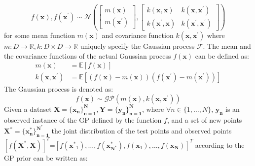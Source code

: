 \begin{equation}\label{GPDef}
    f(\mathbf{x}), f\left(\mathbf{x}^{\prime}\right) \sim \mathcal{N}\left(\left[\begin{array}{c}
    m(\mathbf{x})  \tag{1}\\
    m\left(\mathbf{x}^{\prime}\right)
    \end{array}\right],\left[\begin{array}{cc}
    k(\mathbf{x}, \mathbf{x}) & k\left(\mathbf{x}, \mathbf{x}^{\prime}\right) \\
    k\left(\mathbf{x}^{\prime}, \mathbf{x}\right) & k\left(\mathbf{x}^{\prime}, \mathbf{x}^{\prime}\right)
    \end{array}\right]\right)
\end{equation}
for some mean function $m(\mathbf{x})$ and covariance function $k\left(\mathbf{x}, \mathbf{x}^{\prime}\right)$ where $m: D \rightarrow \mathbb{R}, k: D \times D \rightarrow \mathbb{R}$ uniquely specify the Gaussian process $\mathcal{F}$. The mean and the covariance functions of the actual Gaussian process $f(\mathbf{x})$ can be defined as:
\begin{align}\label{GPFunc}
    m(\mathbf{x}) & =\mathbb{E}[f(\mathbf{x})]  \\
    k\left(\mathbf{x}, \mathbf{x}^{\prime}\right) & =\mathbb{E}\left[(f(\mathbf{x})-m(\mathbf{x}))\left(f\left(\mathbf{x}^{\prime}\right)-m\left(\mathbf{x}^{\prime}\right)\right)\right]
\end{align}
The Gaussian process is denoted as:
\begin{equation}\label{GPForm}
f(\mathbf{x}) \sim \mathcal{G} \mathcal{P}\left(m(\mathbf{x}), k\left(\mathbf{x}, \mathbf{x}^{\prime}\right)\right)
\end{equation}
Given a dataset $\mathbf{X=\{x_n\}_{n=1}^N, Y=\{y_n\}_{n=1}^N}$, where $\forall n \in \{1, \ldots, N\}$, $\mathbf{y_n}$ is an observed instance of the GP defined by the function $f$, and a set of new points $\mathbf{X^*=\{x^*_n\}_{n=1}^{N^*}}$ the joint distribution of the test points and observed points $\left[f(\mathbf{X^*, X})\right]^T$=$\left[f\left(\mathbf{x^*}_{1}\right), \ldots, f\left(\mathbf{x^*_{N^*}}\right), f\left(\mathbf{x}_{1}\right), \ldots, f\left(\mathbf{x_{N}}\right)\right]^T$ according to the GP prior can be written as:
